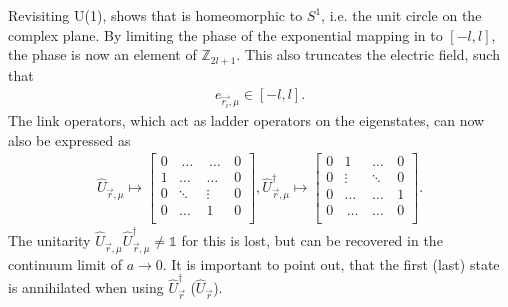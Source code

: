 Revisiting U(1), shows that is homeomorphic to $S^1$, i.e. the unit circle on the complex plane. By limiting the phase of the exponential mapping in  to $[-l, l]$, the phase is now an element of $\mathbb{Z}_{2l+1}$. This also truncates the electric field, such that
\begin{align}
e_{\vec{r_i}, \mu}\in[-l, l].
\end{align}
The link operators, which act as ladder operators on the eigenstates, can now also be expressed as
\begin{align*}
	\hat{U}_{\vec{r}, \mu} \mapsto \begin{bmatrix}
		                               0 & \,\dots\, & \,\dots \, & 0 \\
		                               1 & \dots     & \dots      & 0 \\
		                               0 & \ddots    & \vdots     & 0 \\
		                               0 & \dots     & 1          & 0 \\
	                               \end{bmatrix}, \hat{U}_{\vec{r}, \mu}^{\dag} \mapsto \begin{bmatrix}
		                                                                                    0 & 1          & \dots    & 0 \\
		                                                                                    0 & \vdots     & \ddots   & 0 \\
		                                                                                    0 & \dots      & \dots    & 1 \\
		                                                                                    0 & \,\dots \, & \dots \, & 0 \\
	                                                                                    \end{bmatrix}.
\end{align*}
The unitarity $\hat{U}_{\vec{r}, \mu}\hat{U}_{\vec{r}, \mu}^\dag\neq\mathds{1}$ for this is lost, but can be recovered in the continuum limit of $a\rightarrow0$. It is important to point out, that the first (last) state is annihilated when using $\hat{U}_{\vec{r}}^{\dag}$ ($\hat{U}_{\vec{r}}$).
